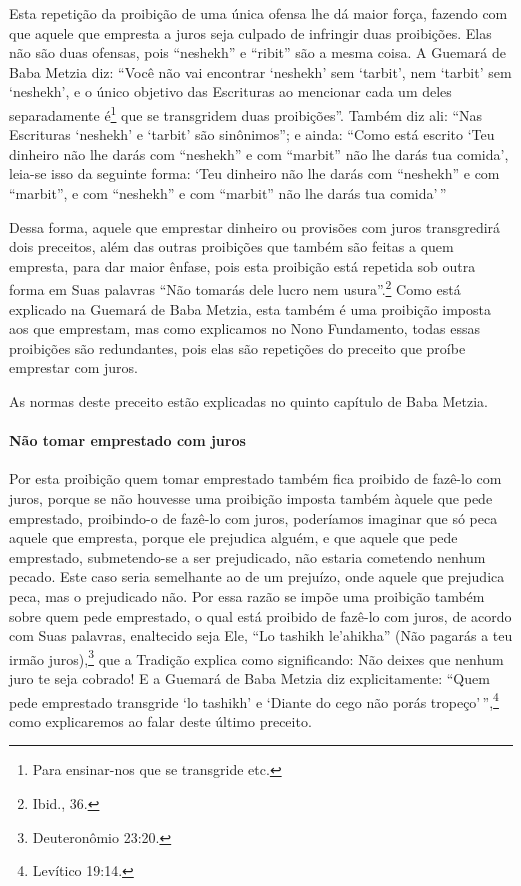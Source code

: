 Esta repetição da proibição de uma única ofensa lhe dá maior força,
fazendo com que aquele que empresta a juros seja culpado de infringir
duas proibições. Elas não são duas ofensas, pois ``neshekh'' e ``ribit''
são a mesma coisa. A Guemará de Baba Metzia diz: ``Você não vai
encontrar `neshekh' sem `tarbit', nem `tarbit' sem `neshekh', e o único
objetivo das Escrituras ao mencionar cada um deles separadamente
é\footnote{Para ensinar-nos que se transgride etc.} que se transgridem duas proibições''. Também diz
ali: ``Nas Escrituras `neshekh' e `tarbit' são sinônimos''; e ainda:
``Como está escrito `Teu dinheiro não lhe darás com ``neshekh'' e com
``marbit'' não lhe darás tua comida', leia-se isso da seguinte forma:
`Teu dinheiro não lhe darás com ``neshekh'' e com ``marbit'', e com
``neshekh'' e com ``marbit'' não lhe darás tua comida'\,''

Dessa forma, aquele que emprestar dinheiro ou provisões com juros
transgredirá dois preceitos, além das outras proibições que também são
feitas a quem empresta, para dar maior ênfase, pois esta proibição está
repetida sob outra forma em Suas palavras ``Não tomarás dele lucro nem
usura''.\footnote{Ibid., 36.} Como está explicado na Guemará de Baba Metzia, esta
também é uma proibição imposta aos que emprestam, mas como explicamos
no Nono Fundamento, todas essas proibições são redundantes, pois elas
são repetições do preceito que proíbe emprestar com juros.

As normas deste preceito estão explicadas no quinto capítulo de Baba Metzia.

\paragraph{Não tomar emprestado com juros}

Por esta proibição quem tomar emprestado também fica proibido de fazê-lo
com juros, porque se não houvesse uma proibição imposta também àquele
que pede emprestado, proibindo-o de fazê-lo com juros, poderíamos
imaginar que só peca aquele que empresta, porque ele prejudica alguém, e
que aquele que pede emprestado, submetendo-se a ser prejudicado, não
estaria cometendo nenhum pecado. Este caso seria semelhante ao de um
prejuízo, onde aquele que prejudica peca, mas o prejudicado não. Por
essa razão se impõe uma proibição também sobre quem pede emprestado, o
qual está proibido de fazê-lo com juros, de acordo com Suas palavras,
enaltecido seja Ele, ``Lo tashikh le'ahikha'' (Não pagarás a teu irmão
juros),\footnote{Deuteronômio 23:20.} que a Tradição explica como significando:
Não deixes que nenhum juro te seja cobrado! E a Guemará de Baba Metzia
diz explicitamente: ``Quem pede emprestado transgride `lo tashikh' e
`Diante do cego não porás tropeço'\,'',\footnote{Levítico 19:14.} como explicaremos
ao falar deste último preceito.

